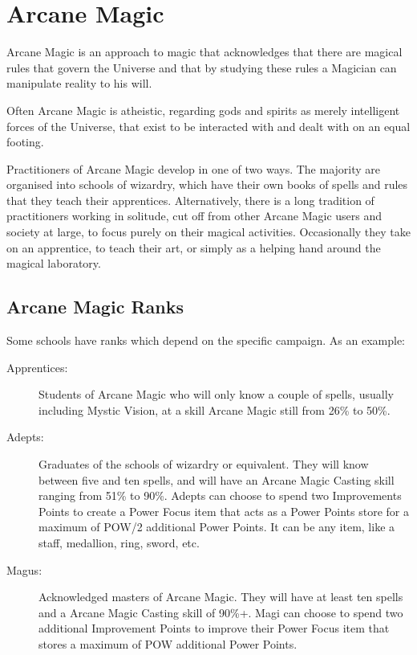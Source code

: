 \chapter{Arcane Magic}
\label{ch:arcane}

Arcane Magic is an approach to magic that acknowledges that there are magical rules that govern the Universe and that by studying these rules a Magician can manipulate reality to his will.

Often Arcane Magic is atheistic, regarding gods and spirits as merely intelligent forces of the Universe, that exist to be interacted with and dealt with on an equal footing. 

Practitioners of Arcane Magic develop in one of two ways. The majority are organised into schools of wizardry, which have their own books of spells and rules that they teach their apprentices. Alternatively, there is a long tradition of practitioners working in solitude, cut off from other Arcane Magic users and society at large, to focus purely on their magical activities. Occasionally they take on an apprentice, to teach their art, or simply as a helping hand around the magical laboratory.

\section{Arcane Magic Ranks}
Some schools have ranks which depend on the specific campaign. As an example:
\begin{description}
	\item[Apprentices:] Students of Arcane Magic who will only know a couple of spells, usually including Mystic Vision, at a skill Arcane Magic still from 26\% to 50\%. 
	\item[Adepts:] Graduates of the schools of wizardry or equivalent. They will know between five and ten spells, and will have an Arcane Magic Casting skill ranging from 51\% to 90\%. Adepts can choose to spend two Improvements Points to create a Power Focus item that acts as a Power Points store for a maximum of POW/2 additional Power Points. It can be any item, like a staff, medallion, ring, sword, etc.
	\item[Magus:] Acknowledged masters of Arcane Magic. They will have at least ten spells and a Arcane Magic Casting skill of 90\%+. Magi can choose to spend two additional Improvement Points to improve their Power Focus item that stores a maximum of POW additional Power Points.
\end{description}


